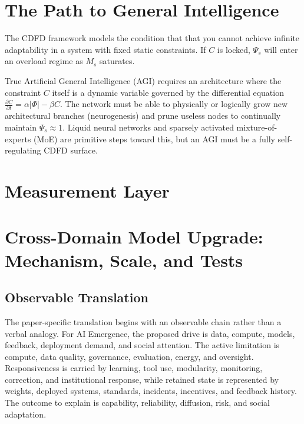 \documentclass[11pt,a4paper]{article}
\begin{document}
\section{The Path to General Intelligence}
The CDFD framework models the condition that that you cannot achieve infinite adaptability in a system with fixed static constraints. If $C$ is locked, $\Psi_s$ will enter an overload regime as $M_s$ saturates.

True Artificial General Intelligence (AGI) requires an architecture where the constraint $C$ itself is a dynamic variable governed by the differential equation $\frac{\partial C}{\partial t} = \alpha |\Phi| - \beta C$. The network must be able to physically or logically grow new architectural branches (neurogenesis) and prune useless nodes to continually maintain $\Psi_s \approx 1$. Liquid neural networks and sparsely activated mixture-of-experts (MoE) are primitive steps toward this, but an AGI must be a fully self-regulating CDFD surface.



\section{Measurement Layer}

\section{Cross-Domain Model Upgrade: Mechanism, Scale, and Tests}

\subsection{Observable Translation}

The paper-specific translation begins with an observable chain rather than a
verbal analogy. For AI Emergence, the proposed drive is data, compute, models, feedback, deployment demand, and social attention.
The active limitation is compute, data quality, governance, evaluation, energy, and oversight. Responsiveness is carried by
learning, tool use, modularity, monitoring, correction, and institutional response, while retained state is represented by
weights, deployed systems, standards, incidents, incentives, and feedback history. The outcome to explain is capability, reliability, diffusion, risk, and social adaptation.
\end{document}
